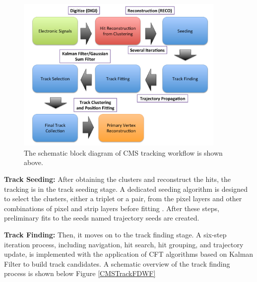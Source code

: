 \begin{figure}[hbtp]
\begin{center}
\includegraphics[width=0.90\textwidth]{Figures/Chapter4/TrackWF.pdf}
\caption{The schematic block diagram of CMS tracking workflow is shown above.}
\label{TrackWorkFlow}
\end{center}
\end{figure} 



\textbf{Track Seeding:} After obtaining the clusters and reconstruct the hits, the tracking is in the track seeding stage. A dedicated seeding algorithm is designed to select the clusters, either a triplet or a pair, from the pixel layers and other combinations of pixel and strip layers before fitting \cite{CMSTrackComp}. After these steps, preliminary fits to the seeds named trajectory seeds are created.


\textbf{Track Finding:} Then, it moves on to the track finding stage. A six-step iteration process, including navigation, hit search, hit grouping, and trajectory update, is implemented with the application of CFT algorithms based on Kalman Filter to build track candidates. A schematic overview of the track finding process is shown below Figure \ref{CMSTrackFDWF}

